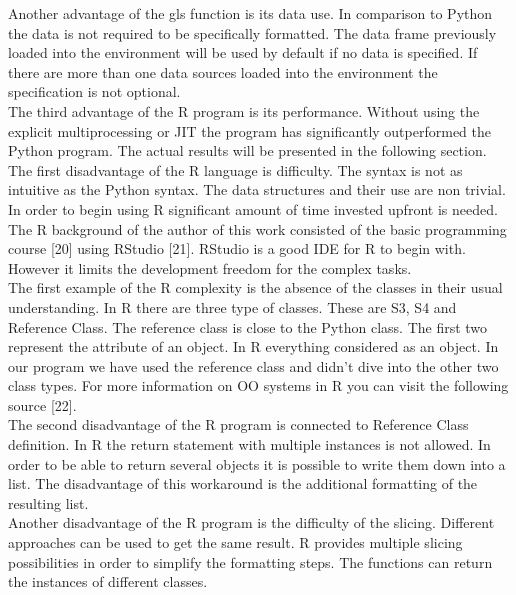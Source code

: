 \documentclass [twoside,
  11pt, a4paper,
  footinclude=true,
  headinclude=true,
  cleardoublepage=empty
]{article}
\begin{document}
Another advantage of the gls function is its data use. In comparison to Python the data is not required to be specifically formatted. The data frame previously loaded into the environment will be used by default if no data is specified. If there are more than one data sources loaded into the environment the specification is not optional.\\
The third advantage of the R program is its performance. Without using the explicit multiprocessing or JIT the program has significantly outperformed the Python program. The actual results will be presented in the following section.\\
The first disadvantage of the R language is difficulty. The syntax is not as intuitive as the Python syntax. The data structures and their use are non trivial. In order to begin using R significant amount of time invested upfront is needed. The R background of the author of this work consisted of the basic programming course [20] using RStudio [21]. RStudio is a good IDE for R to begin with. However it limits the development freedom for the complex tasks.\\
The first example of the R complexity is the absence of the classes in their usual understanding. In R there are three type of classes. These are S3, S4 and Reference Class. The reference class is close to the Python class. The first two represent the attribute of an object. In R everything considered as an object. In our program we have used the reference class and didn't dive into the other two class types. For more information on OO systems in R you can visit the following source [22]. \\
The second disadvantage of the R program is connected to Reference Class definition. In R the return statement with multiple instances is not allowed. In order to be able to return several objects it is possible to write them down into a list. The disadvantage of this workaround is the additional formatting of the resulting list.\\
Another disadvantage of the R program is the difficulty of the slicing. Different approaches can be used to get the same result. R provides multiple slicing possibilities in order to simplify the formatting steps. The functions can return the instances of different classes.
\end{document}
